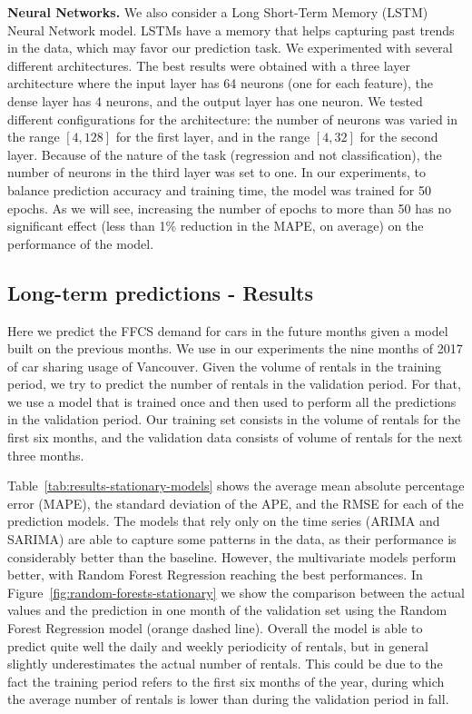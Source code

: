 \textbf{Neural Networks.} We also consider a  Long Short-Term Memory (LSTM) Neural Network  model. LSTMs have a memory that helps capturing past trends in the data, which may favor our prediction task. We experimented with several different architectures. The best results were obtained with a three layer architecture where the input layer has 64 neurons (one for each feature), the dense layer has 4 neurons, and the output layer has one neuron. %
We tested different configurations for the architecture: the number of neurons was varied in the range $[4, 128]$ for the first layer, and in the range $[4, 32]$ for the second layer. Because of the nature of the task (regression and not classification), the number of neurons in the third layer was set to one.
In our experiments, to balance prediction accuracy and training time, the model was trained for 50 epochs. As we will see, increasing the number of epochs to more than 50 has no significant effect (less than 1\% reduction in the MAPE, on average) on the performance of the model.



\subsection{Long-term predictions -  Results}

Here we predict the FFCS demand for cars in the future months given a model built on the previous months. We use in our experiments the nine months of 2017 of car sharing usage of Vancouver. 
Given the volume of rentals in the training period, we try to predict the number of rentals in the validation period. For that, we use a  model that is trained once and then used to perform all the predictions in the validation period. 
Our training set consists in the volume of rentals for the first six months, and the validation data consists of volume of rentals for the next three months.

Table~\ref{tab:results-stationary-models} shows the average mean absolute percentage error (MAPE), the standard deviation of the APE, and the RMSE for each of the prediction models.
The models that rely only on the time series (ARIMA and SARIMA) are able to capture some patterns in the data, as their performance is considerably better than the baseline. However, the multivariate models perform better, with Random Forest Regression reaching the best performances. In Figure~\ref{fig:random-forests-stationary} we show the comparison between the actual values and the prediction in one month of the validation set using the Random Forest Regression model (orange dashed line). Overall the model is able to predict quite well the daily and weekly periodicity of rentals, but in general slightly underestimates the actual number of rentals. This could be due to the fact the training period refers to the first six months of the year, during which the average number of rentals is lower than during the validation period in fall.



